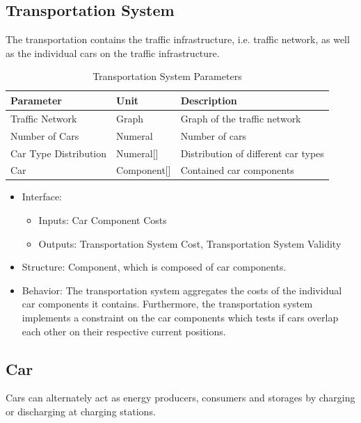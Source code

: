 \subsection{Transportation System}

The transportation contains the traffic infrastructure, i.e. traffic network,  as well as the individual cars on the traffic infrastructure.

	 \begin{table}[h]
	 	\renewcommand{\arraystretch}{1.3}
	 	\caption{Transportation System Parameters}
	 	\centering
	 	\begin{tabular}{lll}
	 		\hline
	 		\textbf{Parameter}                    & \textbf{Unit} & \textbf{Description} \\ \hline
	 		Traffic Network                  	  & Graph          & Graph of the traffic network      \\
	 		Number of Cars                          & Numeral    & Number of cars      \\ 
	 		Car Type Distribution                          & Numeral[]    & Distribution of different car types      \\ 
	 		Car                          & Component[]    & Contained car components      \\ \hline
	 	\end{tabular}
	 \end{table}
	 \begin{itemize}
	\item Interface:
			\begin{itemize}
				\item Inputs: Car Component Costs
				\item Outputs: Transportation System Cost, Transportation System Validity
			\end{itemize}	 
	\item Structure: Component, which is composed of car components.
	\item Behavior: The transportation system aggregates the costs of the individual car components it contains. Furthermore, the transportation system implements a constraint on the car components which tests if cars overlap each other on their respective current positions.
\end{itemize}

\subsection{Car}

Cars can alternately act as energy producers, consumers and storages by charging or discharging at charging stations.

